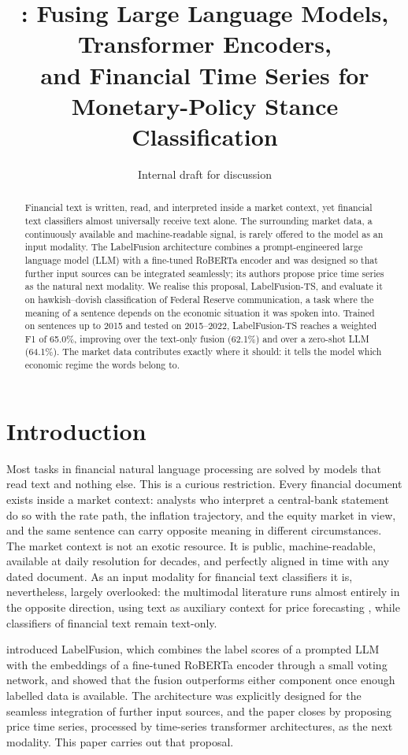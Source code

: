 \documentclass[11pt]{article}
\title{\lfts{}: Fusing Large Language Models, Transformer Encoders,\\and Financial Time Series for Monetary-Policy Stance Classification}
\author{Internal draft for discussion}
\newcommand{\lfts}{LabelFusion\hbox{-}TS}
\newcommand{\lf}{LabelFusion}
\begin{document}
\maketitle

\begin{abstract}
Financial text is written, read, and interpreted inside a market context, yet financial text classifiers almost universally receive text alone. The surrounding market data, a continuously available and machine-readable signal, is rarely offered to the model as an input modality. The \lf{} architecture combines a prompt-engineered large language model (LLM) with a fine-tuned RoBERTa encoder and was designed so that further input sources can be integrated seamlessly; its authors propose price time series as the natural next modality. We realise this proposal, \lfts{}, and evaluate it on hawkish--dovish classification of Federal Reserve communication, a task where the meaning of a sentence depends on the economic situation it was spoken into. Trained on sentences up to 2015 and tested on 2015--2022, \lfts{} reaches a weighted F1 of 65.0\%, improving over the text-only fusion (62.1\%) and over a zero-shot LLM (64.1\%). The market data contributes exactly where it should: it tells the model which economic regime the words belong to.
\end{abstract}


\section{Introduction}

Most tasks in financial natural language processing are solved by models that read text and nothing else. This is a curious restriction. Every financial document exists inside a market context: analysts who interpret a central-bank statement do so with the rate path, the inflation trajectory, and the equity market in view, and the same sentence can carry opposite meaning in different circumstances. The market context is not an exotic resource. It is public, machine-readable, available at daily resolution for decades, and perfectly aligned in time with any dated document. As an input modality for financial text classifiers it is, nevertheless, largely overlooked: the multimodal literature runs almost entirely in the opposite direction, using text as auxiliary context for price forecasting \citep{tan2025inferring,dolphin2022multimodal}, while classifiers of financial text remain text-only.

\citet{schlee2025labelfusion} introduced \lf{}, which combines the label scores of a prompted LLM with the embeddings of a fine-tuned RoBERTa encoder \citep{liu2019roberta} through a small voting network, and showed that the fusion outperforms either component once enough labelled data is available. The architecture was explicitly designed for the seamless integration of further input sources, and the paper closes by proposing price time series, processed by time-series transformer architectures, as the next modality. This paper carries out that proposal.
\end{document}
